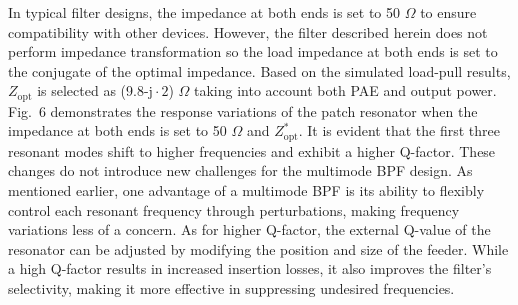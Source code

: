 \documentclass[twoside,twocolumn]{article}
\begin{document}
In typical filter designs, the impedance at both ends is set to 50 $\Omega$ to ensure compatibility with other devices. However, the filter described herein does not perform impedance transformation so the load impedance at both ends is set to the conjugate of the optimal impedance. Based on the simulated load-pull results, $Z_{\mathrm{opt}}$ is selected as (9.8-$\mathrm{j}\cdot 2$) $\Omega$ taking into account both PAE and output power. Fig.~6 demonstrates the response variations of the patch resonator when the impedance at both ends is set to 50 $\Omega$ and $Z_{\mathrm{opt}}^{*}$. It is evident that the first three resonant modes shift to higher frequencies and exhibit a higher Q-factor. These changes do not introduce new challenges for the multimode BPF design. As mentioned earlier, one advantage of a multimode BPF is its ability to flexibly control each resonant frequency through perturbations, making frequency variations less of a concern. As for higher Q-factor, the external Q-value of the resonator can be adjusted by modifying the position and size of the feeder. While a high Q-factor results in increased insertion losses, it also improves the filter's selectivity, making it more effective in suppressing undesired frequencies.
\end{document}
